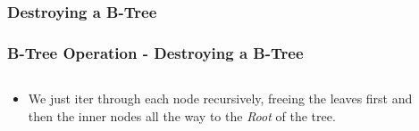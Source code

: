 \documentclass{beamer}
\begin{document}
\begin{frame}
    \subsubsection{Destroying a B-Tree}
    \frametitle{B-Tree Operation - Destroying a B-Tree}
    \begin{columns}
        \begin{column}{\textlecolumn}
            \begin{block}{}
                \begin{itemize}
                    \item We just iter through each node recursively, freeing the leaves first and then the inner nodes all the way to the \emph{Root} of the tree.
                \end{itemize}
                \btreeDestroy
            \end{block}
        \end{column}
        \begin{column}{\textricolumn}
        \end{column}
    \end{columns}
\end{frame}
\end{document}
